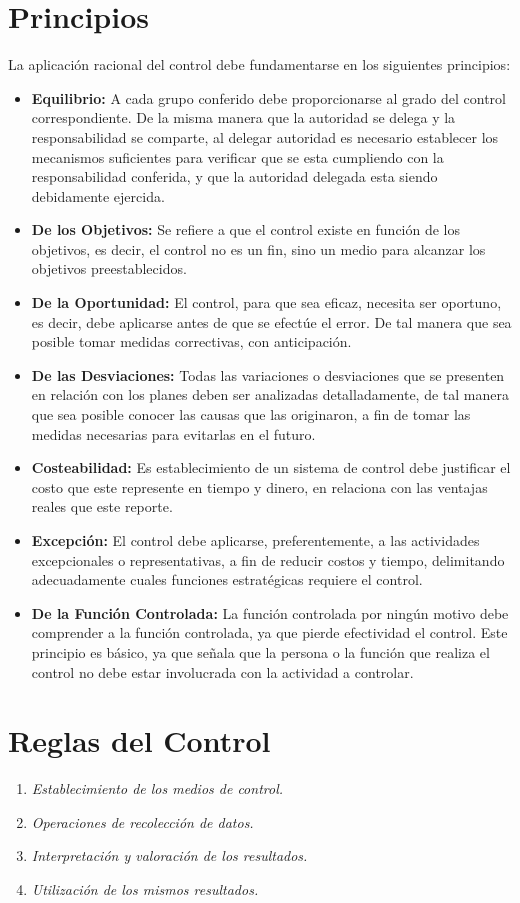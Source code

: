 \documentclass[12pt,letterpaper]{article}
\begin{document}
\section{Principios}
La aplicación racional del control debe fundamentarse en los siguientes principios:
\begin{itemize}
\item \textbf{Equilibrio:} A cada grupo conferido debe proporcionarse al grado del control correspondiente. De la misma manera que la autoridad se delega y la responsabilidad se comparte, al delegar autoridad es necesario establecer los mecanismos suficientes para verificar que se esta cumpliendo con la responsabilidad conferida, y que la autoridad delegada esta siendo debidamente ejercida.
\item \textbf{De los Objetivos:} Se refiere a que el control existe en función de los objetivos, es decir, el control no es un fin, sino un medio para alcanzar los objetivos preestablecidos.
\item \textbf{De la Oportunidad:} El control, para que sea eficaz, necesita ser oportuno, es decir, debe aplicarse antes de que se efectúe el error. De tal manera que sea posible tomar medidas correctivas, con anticipación.
\item \textbf{De las Desviaciones:} Todas las variaciones o desviaciones que se presenten en relación con los planes deben ser analizadas detalladamente, de tal manera que sea posible conocer las causas que las originaron, a fin de tomar las medidas necesarias para evitarlas en el futuro.
\item \textbf{Costeabilidad: }Es establecimiento de un sistema de control debe justificar el costo que este represente en tiempo y dinero, en relaciona con las ventajas reales que este reporte.
\item \textbf{Excepción:} El control debe aplicarse, preferentemente, a las actividades excepcionales o representativas, a fin de reducir costos y tiempo, delimitando adecuadamente cuales funciones estratégicas requiere el control.
\item \textbf{De la Función Controlada:} La función controlada por ningún motivo debe comprender a la función controlada, ya que pierde efectividad el control. Este principio es básico, ya que señala que la persona o la función que realiza el control no debe estar involucrada con la actividad a controlar.

\end{itemize}

\section{Reglas del Control}
\begin{enumerate}
\item	\textit{Establecimiento de los medios de control.}
\item	\textit{Operaciones de recolección de datos.}
\item	\textit{Interpretación y valoración de los resultados.}
\item	\textit{Utilización de los mismos resultados.}
\end{enumerate}
\end{document}
